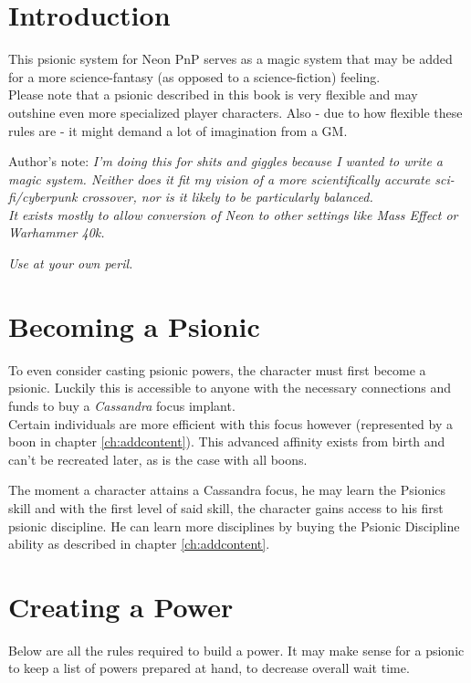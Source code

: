 \documentclass[12pt,a4paper,openany]{book}
\begin{document}
	

	\chapter{Introduction}
	This psionic system for Neon PnP serves as a magic system that may be added for a more science-fantasy (as opposed to a science-fiction) feeling.\\
	Please note that a psionic described in this book is very flexible and may outshine even more specialized player characters. Also - due to how flexible these rules are - it might demand a lot of imagination from a GM.

	Author's note: \emph{I'm doing this for shits and giggles because I wanted to write a magic system. Neither does it fit my vision of a more scientifically accurate sci-fi/cyberpunk crossover, nor is it likely to be particularly balanced.\\
		It exists mostly to allow conversion of Neon to other settings like Mass Effect or Warhammer 40k.}
		\par
		\emph{Use at your own peril.}

	\chapter{Becoming a Psionic}
	To even consider casting psionic powers, the character must first become a psionic. Luckily this is accessible to anyone with the necessary connections and funds to buy a \emph{Cassandra} focus implant.\\
	Certain individuals are more efficient with this focus however (represented by a boon in chapter \ref{ch:addcontent}). This advanced affinity exists from birth and can't be recreated later, as is the case with all boons. \par
	The moment a character attains a Cassandra focus, he may learn the Psionics skill and with the first level of said skill, the character gains access to his first psionic discipline. He can learn more disciplines by buying the Psionic Discipline ability as described in chapter \ref{ch:addcontent}.

	\chapter{Creating a Power}
	\label{ch:create}
	Below are all the rules required to build a power. It may make sense for a psionic to keep a list of powers prepared at hand, to decrease overall wait time.
\end{document}
